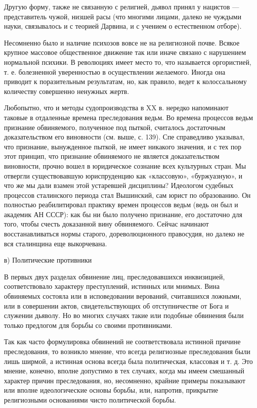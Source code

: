 Другую форму, также не связанную с религией, дьявол принял у нацистов ---
представитель чужой, низшей расы (что многими лицами, далеко не чуждыми науки,
связывалось и с теорией Дарвина, и с учением о естественном отборе).

Несомненно было и наличие психозов вовсе не на религиозной почве. Всякое
крупное массовое общественное движение так или иначе связано с нарушением
нормальной психики. В революциях имеет место то, что называется оргористией, т.
е. болезненной уверенностью в осуществлении желаемого. Иногда она приводит к
поразительным результатам, но, как правило, ведет к колоссальному количеству
совершенно ненужных жертв.

Любопытно, что и методы судопроизводства в XX в. нередко напоминают таковые в
отдаленные времена преследования ведьм. Во времена процессов ведьм признание
обвиняемого, полученное под пыткой, считалось достаточным доказательством его
виновности (см. выше,
с. 139). Спе справедливо указывал, что признание, вынужденное пыткой, не имеет
никакого значения, и с тех пор этот принцип, что признание обвиняемого не
является доказательством виновности, прочно вошел в юридическое сознание всех
культурных стран. Мы отвергли существовавшую юриспруденцию как «классовую»,
«буржуазную», и что же мы дали взамен этой устаревшей дисциплины? Идеологом
судебных процессов сталинского периода стал Вышинский, сам юрист по
образованию. Он полностью реабилитировал практику времен процессов ведьм (ведь
он был и академик АН СССР): как бы ни было получено признание, его достаточно
для того, чтобы счесть доказанной вину обвиняемого. Сейчас начинают
восстанавливаться нормы старого, дореволюционного правосудия, но далеко не вся
сталинщина еще выкорчевана.

в) Политические противники

В первых двух разделах обвинение лиц, преследовавшихся инквизицией,
соответствовало характеру преступлений, истинных или мнимых. Вина обвиняемых
состояла или в исповедовании верований, считавшихся ложными, или в совершении
актов, свидетельствующих об отступничестве от Бога и служении дьяволу. Но во
многих случаях такие или подобные обвинения были только предлогом для борьбы со
своими противниками.

Так как часто формулировка обвинений не соответствовала истинной причине
преследования, то возникло мнение, что всегда религиозные преследования были
лишь ширмой, а истинная основа всегда была политическая, классовая и т. д. Это
мнение, конечно, вполне допустимо в тех случаях, когда мы имеем смешанный
характер причин преследования, но, несомненно, крайние примеры показывают или
вполне идеологические основы борьбы, или, напротив, прикрытие религиозными
основаниями чисто политической борьбы.

